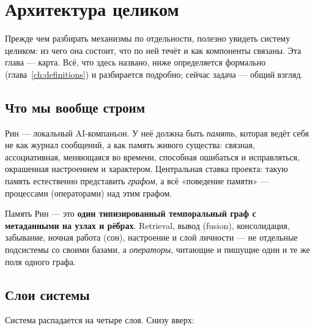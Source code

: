 \chapter{Архитектура целиком}
\label{ch:architecture}

Прежде чем разбирать механизмы по отдельности, полезно увидеть систему целиком:
из чего она состоит, что по ней течёт и как компоненты связаны. Эта глава — карта.
Всё, что здесь названо, ниже определяется формально (глава~\ref{ch:definitions}) и
разбирается подробно; сейчас задача — общий взгляд.

\section{Что мы вообще строим}

Рин — локальный AI-компаньон. У неё должна быть \emph{память}, которая ведёт себя не
как журнал сообщений, а как память живого существа: связная, ассоциативная,
меняющаяся во времени, способная ошибаться и исправляться, окрашенная настроением и
характером. Центральная ставка проекта: такую память естественно представить
\emph{графом}, а всё «поведение памяти» — процессами (операторами) над этим графом.

\begin{principle}
Память Рин — это \textbf{один типизированный темпоральный граф с метаданными на
узлах и рёбрах}. Retrieval, вывод (fusion), консолидация, забывание, ночная работа
(сон), настроение и слой личности — не отдельные подсистемы со своими базами, а
\emph{операторы}, читающие и пишущие одни и те же поля одного графа.
\end{principle}

\section{Слои системы}

Система распадается на четыре слоя. Снизу вверх:

